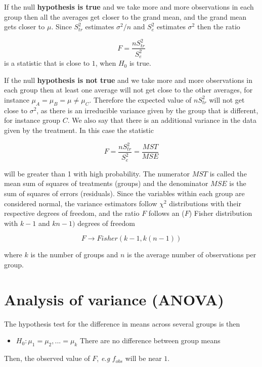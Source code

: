 \documentclass[
]{book}
\providecommand{\tightlist}{%
  \setlength{\itemsep}{0pt}\setlength{\parskip}{0pt}}
\begin{document}
If the null \textbf{hypothesis is true} and we take more and more observations in each group then all the averages get closer to the grand mean, and the grand mean gets closer to \(\mu\). Since \(S_{tr}^2\) estimates \(\sigma^2/n\) and \(S_e^2\) estimates \(\sigma^2\) then the ratio

\[F=\frac{n S_{tr}^2}{S_e^2}\]
is a statistic that is close to \(1\), when \(H_0\) is true.

If the null \textbf{hypothesis is not true} and we take more and more observations in each group then at least one average will not get close to the other averages, for instance \(\mu_A=\mu_B=\mu \neq \mu_C\). Therefore the expected value of \(nS^2_{tr}\) will not get close to \(\sigma^2\), as there is an irreducible variance given by the group that is different, for instance group \(C\). We also say that there is an additional variance in the data given by the treatment. In this case the statistic

\[F=\frac{n S_{tr}^2}{S_e^2}=\frac{MST}{MSE}\]

will be greater than 1 with high probability. The numerator \(MST\) is called the mean sum of squares of treatments (groups) and the denominator \(MSE\) is the sum of squares of errors (residuals). Since the variables within each group are considered normal, the variance estimators follow \(\chi^2\) distributions with their respective degrees of freedom, and the ratio \(F\) follows an (\(F\)) Fisher distribution with \(k-1\) and \(kn-1)\) degrees of freedom

\[F \rightarrow Fisher(k-1, k(n-1))\]

where \(k\) is the number of groups and \(n\) is the average number of observations per group.

\hypertarget{analysis-of-variance-anova}{%
\section{Analysis of variance (ANOVA)}\label{analysis-of-variance-anova}}

The hypothesis test for the difference in means across several groups is then

\begin{itemize}
\tightlist
\item
  \(H_0: \mu_1=\mu_2, ...=\mu_k\) There are no difference between group means
\end{itemize}

Then, the observed value of \(F\), \emph{e.g} \(f_{obs}\) will be near \(1\).
\end{document}
